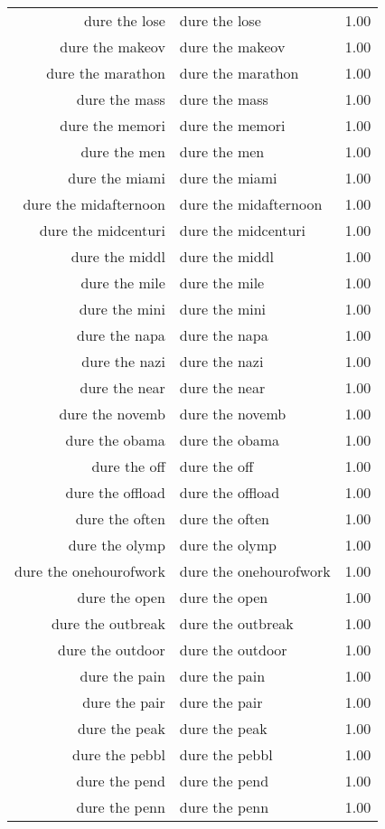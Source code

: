 \begin{table}[ht]
\begin{tabular}{rlr}
  dure the lose & dure the lose & 1.00 \\ 
  dure the makeov & dure the makeov & 1.00 \\ 
  dure the marathon & dure the marathon & 1.00 \\ 
  dure the mass & dure the mass & 1.00 \\ 
  dure the memori & dure the memori & 1.00 \\ 
  dure the men & dure the men & 1.00 \\ 
  dure the miami & dure the miami & 1.00 \\ 
  dure the midafternoon & dure the midafternoon & 1.00 \\ 
  dure the midcenturi & dure the midcenturi & 1.00 \\ 
  dure the middl & dure the middl & 1.00 \\ 
  dure the mile & dure the mile & 1.00 \\ 
  dure the mini & dure the mini & 1.00 \\ 
  dure the napa & dure the napa & 1.00 \\ 
  dure the nazi & dure the nazi & 1.00 \\ 
  dure the near & dure the near & 1.00 \\ 
  dure the novemb & dure the novemb & 1.00 \\ 
  dure the obama & dure the obama & 1.00 \\ 
  dure the off & dure the off & 1.00 \\ 
  dure the offload & dure the offload & 1.00 \\ 
  dure the often & dure the often & 1.00 \\ 
  dure the olymp & dure the olymp & 1.00 \\ 
  dure the onehourofwork & dure the onehourofwork & 1.00 \\ 
  dure the open & dure the open & 1.00 \\ 
  dure the outbreak & dure the outbreak & 1.00 \\ 
  dure the outdoor & dure the outdoor & 1.00 \\ 
  dure the pain & dure the pain & 1.00 \\ 
  dure the pair & dure the pair & 1.00 \\ 
  dure the peak & dure the peak & 1.00 \\ 
  dure the pebbl & dure the pebbl & 1.00 \\ 
  dure the pend & dure the pend & 1.00 \\ 
  dure the penn & dure the penn & 1.00 \\ 

\end{tabular}
\end{table}
